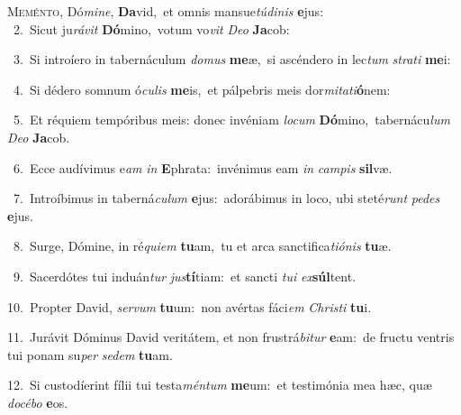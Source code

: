 \lettrine{\initial\textcolor{\initialcolor}{M}}{eménto,} Dó\-\textit{mi}\-\textit{ne}, \textbf{Da}\-vid,~\star et omnis mansue\-\textit{tú}\-\textit{di}\textit{nis} \textbf{e}\-jus:\\
{\numbfont\textcolor{\numbcolor}{~2.}}~Sicut ju\-\textit{rá}\-\textit{vit} \textbf{Dó}\-mino,~\star votum vo\textit{vit} \textit{De}\-\textit{o} \textbf{Ja}\-cob:\par
{\numbfont\textcolor{\numbcolor}{~3.}}~Si introíero in tabernáculum \textit{do}\-\textit{mus} \textbf{me}\-æ,~\star si ascéndero in lec\textit{tum} \textit{stra}\-\textit{ti} \textbf{me}\-i:\par
{\numbfont\textcolor{\numbcolor}{~4.}}~Si dédero somnum ó\-\textit{cu}\-\textit{lis} \textbf{me}\-is,~\star et pálpebris meis dor\-\textit{mi}\-\textit{ta}\textit{ti}\textbf{ó}nem:\par
{\numbfont\textcolor{\numbcolor}{~5.}}~Et réquiem tempóribus meis: donec invéniam \textit{lo}\-\textit{cum} \textbf{Dó}\-mino,~\star tabernácu\textit{lum} \textit{De}\-\textit{o} \textbf{Ja}\-cob.\par
{\numbfont\textcolor{\numbcolor}{~6.}}~Ecce audívimus e\textit{am} \textit{in} \textbf{E}\-phrata:~\star invénimus eam \textit{in} \textit{cam}\-\textit{pis} \textbf{sil}\-væ.\par
{\numbfont\textcolor{\numbcolor}{~7.}}~Introíbimus in taberná\-\textit{cu}\-\textit{lum} \textbf{e}\-jus:~\star adorábimus in loco, ubi steté\textit{runt} \textit{pe}\-\textit{des} \textbf{e}\-jus.\par
{\numbfont\textcolor{\numbcolor}{~8.}}~Surge, Dómine, in ré\-\textit{qui}\-\textit{em} \textbf{tu}\-am,~\star tu et arca sanctifica\-\textit{ti}\-\textit{ó}\textit{nis} \textbf{tu}\-æ.\par
{\numbfont\textcolor{\numbcolor}{~9.}}~Sacerdótes tui induán\textit{tur} \textit{jus}\-\textbf{tí}tiam:~\star et sancti \textit{tu}\-\textit{i} \textit{ex}\-\textbf{súl}tent.\par
{\numbfont\textcolor{\numbcolor}{10.}}~Propter David, \textit{ser}\-\textit{vum} \textbf{tu}\-um:~\star non avértas fáci\textit{em} \textit{Chris}\-\textit{ti} \textbf{tu}\-i.\par
{\numbfont\textcolor{\numbcolor}{11.}}~Jurávit Dóminus David veritátem, et non frustrá\-\textit{bi}\-\textit{tur} \textbf{e}\-am:~\star de fructu ventris tui ponam su\textit{per} \textit{se}\-\textit{dem} \textbf{tu}\-am.\par
{\numbfont\textcolor{\numbcolor}{12.}}~Si custodíerint fílii tui testa\-\textit{mén}\-\textit{tum} \textbf{me}\-um:~\star et testimónia mea hæc, quæ \textit{do}\-\textit{cé}\textit{bo} \textbf{e}\-os.\par

